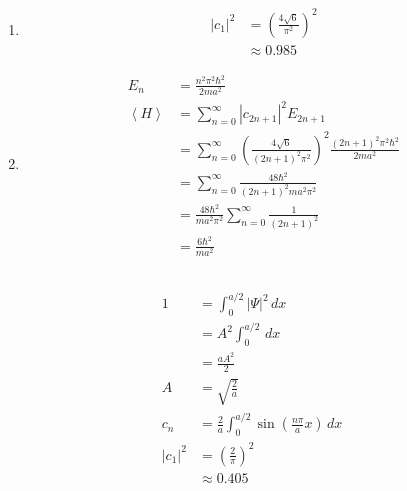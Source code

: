 \documentclass{article}
\newcommand{\ev}[1]{\left< #1 \right>}
\begin{document}
\begin{enumerate}
  \item

        \begin{align*}
          |c_1|^2 & = \left( \frac{4 \sqrt{6}}{\pi^2} \right)^2 \\
                  & \approx 0.985
        \end{align*}

  \item

        \begin{align*}
          E_n    & = \frac{n^2 \pi^2 \hbar^2}{2 m a^2}                                                                                   \\
          \ev{H} & = \sum_{n = 0}^\infty |c_{2 n + 1}|^2 E_{2 n + 1}                                                                     \\
                 & = \sum_{n = 0}^\infty \left( \frac{4 \sqrt{6}}{(2 n + 1)^2 \pi^2} \right)^2 \frac{(2 n + 1)^2 \pi^2 \hbar^2}{2 m a^2} \\
                 & = \sum_{n = 0}^\infty \frac{48 \hbar^2}{(2 n + 1)^2 m a^2 \pi^2}                                                      \\
                 & = \frac{48 \hbar^2}{m a^2 \pi^2} \sum_{n = 0}^\infty \frac{1}{(2 n + 1)^2}                                            \\
                 & = \frac{6 \hbar^2}{m a^2}
        \end{align*}
\end{enumerate}

\subsection{}

\begin{align*}
  1       & = \int_0^{a / 2} |\Psi|^2 \,d x                                          \\
          & = A^2 \int_0^{a / 2} \,d x                                               \\
          & = \frac{a A^2}{2}                                                        \\
  A       & = \sqrt{\frac{2}{a}}                                                     \\
  c_n     & = \frac{2}{a} \int_0^{a / 2} \sin \left( \frac{n \pi}{a} x \right) \,d x \\
  |c_1|^2 & = \left( \frac{2}{\pi} \right)^2                                         \\
          & \approx 0.405
\end{align*}
\end{document}

